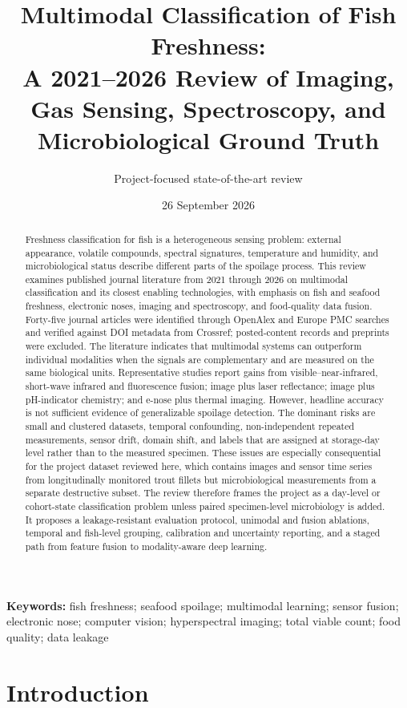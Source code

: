 \documentclass[11pt]{article}
\title{\textbf{Multimodal Classification of Fish Freshness:}\\[2pt]\large A 2021--2026 Review of Imaging, Gas Sensing, Spectroscopy, and Microbiological Ground Truth}
\author{Project-focused state-of-the-art review}
\date{26 September 2026}
\begin{document}
\maketitle

\begin{abstract}
Freshness classification for fish is a heterogeneous sensing problem: external appearance, volatile compounds, spectral signatures, temperature and humidity, and microbiological status describe different parts of the spoilage process. This review examines published journal literature from 2021 through 2026 on multimodal classification and its closest enabling technologies, with emphasis on fish and seafood freshness, electronic noses, imaging and spectroscopy, and food-quality data fusion. Forty-five journal articles were identified through OpenAlex and Europe PMC searches and verified against DOI metadata from Crossref; posted-content records and preprints were excluded. The literature indicates that multimodal systems can outperform individual modalities when the signals are complementary and are measured on the same biological units. Representative studies report gains from visible--near-infrared, short-wave infrared and fluorescence fusion; image plus laser reflectance; image plus pH-indicator chemistry; and e-nose plus thermal imaging. However, headline accuracy is not sufficient evidence of generalizable spoilage detection. The dominant risks are small and clustered datasets, temporal confounding, non-independent repeated measurements, sensor drift, domain shift, and labels that are assigned at storage-day level rather than to the measured specimen. These issues are especially consequential for the project dataset reviewed here, which contains images and sensor time series from longitudinally monitored trout fillets but microbiological measurements from a separate destructive subset. The review therefore frames the project as a day-level or cohort-state classification problem unless paired specimen-level microbiology is added. It proposes a leakage-resistant evaluation protocol, unimodal and fusion ablations, temporal and fish-level grouping, calibration and uncertainty reporting, and a staged path from feature fusion to modality-aware deep learning.
\end{abstract}

\noindent\textbf{Keywords:} fish freshness; seafood spoilage; multimodal learning; sensor fusion; electronic nose; computer vision; hyperspectral imaging; total viable count; food quality; data leakage

\section{Introduction}
\end{document}
